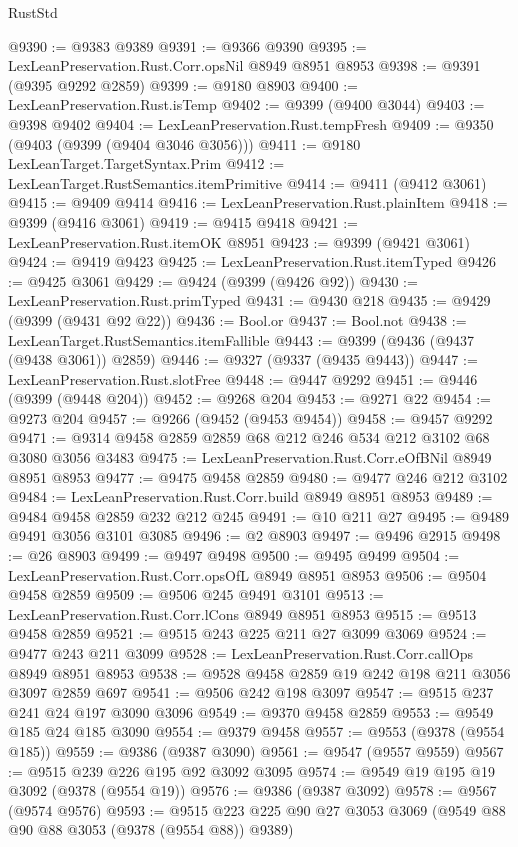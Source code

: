 \begin{lexlean}{RustStd}
\begin{coremodule}
@9390 := @9383 @9389
@9391 := @9366 @9390
@9395 := LexLeanPreservation.Rust.Corr.opsNil @8949 @8951 @8953
@9398 := @9391 (@9395 @9292 @2859)
@9399 := @9180 @8903
@9400 := LexLeanPreservation.Rust.isTemp
@9402 := @9399 (@9400 @3044)
@9403 := @9398 @9402
@9404 := LexLeanPreservation.Rust.tempFresh
@9409 := @9350 (@9403 (@9399 (@9404 @3046 @3056)))
@9411 := @9180 LexLeanTarget.TargetSyntax.Prim
@9412 := LexLeanTarget.RustSemantics.itemPrimitive
@9414 := @9411 (@9412 @3061)
@9415 := @9409 @9414
@9416 := LexLeanPreservation.Rust.plainItem
@9418 := @9399 (@9416 @3061)
@9419 := @9415 @9418
@9421 := LexLeanPreservation.Rust.itemOK @8951
@9423 := @9399 (@9421 @3061)
@9424 := @9419 @9423
@9425 := LexLeanPreservation.Rust.itemTyped
@9426 := @9425 @3061
@9429 := @9424 (@9399 (@9426 @92))
@9430 := LexLeanPreservation.Rust.primTyped
@9431 := @9430 @218
@9435 := @9429 (@9399 (@9431 @92 @22))
@9436 := Bool.or
@9437 := Bool.not
@9438 := LexLeanTarget.RustSemantics.itemFallible
@9443 := @9399 (@9436 (@9437 (@9438 @3061)) @2859)
@9446 := @9327 (@9337 (@9435 @9443))
@9447 := LexLeanPreservation.Rust.slotFree
@9448 := @9447 @9292
@9451 := @9446 (@9399 (@9448 @204))
@9452 := @9268 @204
@9453 := @9271 @22
@9454 := @9273 @204
@9457 := @9266 (@9452 (@9453 @9454))
@9458 := @9457 @9292
@9471 := @9314 @9458 @2859 @2859 @68 @212 @246 @534 @212 @3102 @68 @3080 @3056 @3483
@9475 := LexLeanPreservation.Rust.Corr.eOfBNil @8949 @8951 @8953
@9477 := @9475 @9458 @2859
@9480 := @9477 @246 @212 @3102
@9484 := LexLeanPreservation.Rust.Corr.build @8949 @8951 @8953
@9489 := @9484 @9458 @2859 @232 @212 @245
@9491 := @10 @211 @27
@9495 := @9489 @9491 @3056 @3101 @3085
@9496 := @2 @8903
@9497 := @9496 @2915
@9498 := @26 @8903
@9499 := @9497 @9498
@9500 := @9495 @9499
@9504 := LexLeanPreservation.Rust.Corr.opsOfL @8949 @8951 @8953
@9506 := @9504 @9458 @2859
@9509 := @9506 @245 @9491 @3101
@9513 := LexLeanPreservation.Rust.Corr.lCons @8949 @8951 @8953
@9515 := @9513 @9458 @2859
@9521 := @9515 @243 @225 @211 @27 @3099 @3069
@9524 := @9477 @243 @211 @3099
@9528 := LexLeanPreservation.Rust.Corr.callOps @8949 @8951 @8953
@9538 := @9528 @9458 @2859 @19 @242 @198 @211 @3056 @3097 @2859 @697
@9541 := @9506 @242 @198 @3097
@9547 := @9515 @237 @241 @24 @197 @3090 @3096
@9549 := @9370 @9458 @2859
@9553 := @9549 @185 @24 @185 @3090
@9554 := @9379 @9458
@9557 := @9553 (@9378 (@9554 @185))
@9559 := @9386 (@9387 @3090)
@9561 := @9547 (@9557 @9559)
@9567 := @9515 @239 @226 @195 @92 @3092 @3095
@9574 := @9549 @19 @195 @19 @3092 (@9378 (@9554 @19))
@9576 := @9386 (@9387 @3092)
@9578 := @9567 (@9574 @9576)
@9593 := @9515 @223 @225 @90 @27 @3053 @3069 (@9549 @88 @90 @88 @3053 (@9378 (@9554 @88)) @9389)

\end{coremodule}
\end{lexlean}
